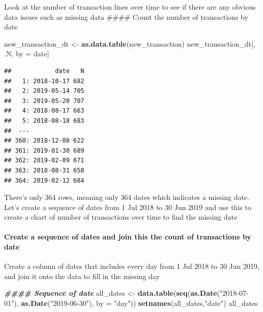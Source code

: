 \documentclass[
]{article}
\newenvironment{Shaded}{\begin{snugshade}}{\end{snugshade}}
\newcommand{\AttributeTok}[1]{\textcolor[rgb]{0.13,0.29,0.53}{#1}}
\newcommand{\DocumentationTok}[1]{\textcolor[rgb]{0.56,0.35,0.01}{\textbf{\textit{#1}}}}
\newcommand{\FunctionTok}[1]{\textcolor[rgb]{0.13,0.29,0.53}{\textbf{#1}}}
\newcommand{\NormalTok}[1]{#1}
\newcommand{\OtherTok}[1]{\textcolor[rgb]{0.56,0.35,0.01}{#1}}
\newcommand{\StringTok}[1]{\textcolor[rgb]{0.31,0.60,0.02}{#1}}
\begin{document}
Look at the number of transaction lines over time to see if there are
any obvious data issues such as missing data \#\#\#\# Count the number
of transactions by date

\begin{Shaded}
\begin{Highlighting}[]
\NormalTok{new\_transaction\_dt }\OtherTok{\textless{}{-}} \FunctionTok{as.data.table}\NormalTok{(new\_transaction)}
\NormalTok{new\_transaction\_dt[, .N, by }\OtherTok{=}\NormalTok{ date]}
\end{Highlighting}
\end{Shaded}

\begin{verbatim}
##            date   N
##   1: 2018-10-17 682
##   2: 2019-05-14 705
##   3: 2019-05-20 707
##   4: 2018-08-17 663
##   5: 2018-08-18 683
##  ---               
## 360: 2018-12-08 622
## 361: 2019-01-30 689
## 362: 2019-02-09 671
## 363: 2018-08-31 658
## 364: 2019-02-12 684
\end{verbatim}

There's only 364 rows, meaning only 364 dates which indicates a missing
date. Let's create a sequence of dates from 1 Jul 2018 to 30 Jun 2019
and use this to create a chart of number of transactions over time to
find the missing date

\hypertarget{create-a-sequence-of-dates-and-join-this-the-count-of-transactions-by-date}{%
\paragraph{Create a sequence of dates and join this the count of
transactions by
date}\label{create-a-sequence-of-dates-and-join-this-the-count-of-transactions-by-date}}

Create a column of dates that includes every day from 1 Jul 2018 to 30
Jun 2019, and join it onto the data to fill in the missing day

\begin{Shaded}
\begin{Highlighting}[]
\DocumentationTok{\#\#\#\# Sequence of date}
\NormalTok{all\_dates }\OtherTok{\textless{}{-}} \FunctionTok{data.table}\NormalTok{(}\FunctionTok{seq}\NormalTok{(}\FunctionTok{as.Date}\NormalTok{(}\StringTok{"2018{-}07{-}01"}\NormalTok{), }\FunctionTok{as.Date}\NormalTok{(}\StringTok{"2019{-}06{-}30"}\NormalTok{), }\AttributeTok{by =} \StringTok{"day"}\NormalTok{))}
\FunctionTok{setnames}\NormalTok{(all\_dates,}\StringTok{"date"}\NormalTok{)}
\NormalTok{all\_dates}
\end{Highlighting}
\end{Shaded}
\end{document}
